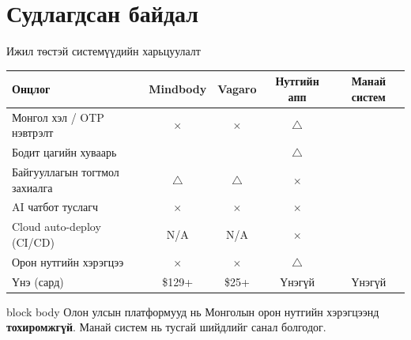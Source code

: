 \documentclass[14pt,aspectratio=169]{beamer}
\newcommand{\YES}{\textcolor{okgreen}{\checkmark}}
\newcommand{\NO}{\textcolor{badred}{$\times$}}
\newcommand{\PART}{\textcolor{partcolor}{$\triangle$}}
\begin{document}
\section{Судлагдсан байдал}
\begin{frame}{Ижил төстэй системүүдийн харьцуулалт}
  \begin{center}
  \small
  \renewcommand{\arraystretch}{1.25}
  \begin{tabular}{lcccc}
    \toprule
    \rowcolor{navyblue}
    {\color{white}\textbf{Онцлог}} &
    {\color{white}\textbf{Mindbody}} &
    {\color{white}\textbf{Vagaro}} &
    {\color{white}\textbf{Нутгийн апп}} &
    {\color{white}\textbf{Манай систем}} \\
    \midrule
    \rowcolor{rowgray}
    Монгол хэл / OTP нэвтрэлт & \NO & \NO & \PART & \YES \\
    Бодит цагийн хуваарь       & \YES & \YES & \PART & \YES \\
    \rowcolor{rowgray}
    Байгууллагын тогтмол захиалга & \PART & \PART & \NO & \YES \\
    AI чатбот туслагч          & \NO & \NO & \NO & \YES \\
    \rowcolor{rowgray}
    Cloud auto-deploy (CI/CD)  & N/A & N/A & \NO & \YES \\
    Орон нутгийн хэрэгцээ      & \NO & \NO & \PART & \YES \\
    \rowcolor{rowgray}
    Үнэ (сард)                 & \$129+ & \$25+ & Үнэгүй & Үнэгүй \\
    \bottomrule
  \end{tabular}
  \end{center}
  \vspace{4pt}
  \begin{beamercolorbox}[sep=4pt,center,rounded=true]{block body}
    \small Олон улсын платформууд нь Монголын орон нутгийн хэрэгцээнд
    \textbf{тохиромжгүй}. Манай систем нь тусгай шийдлийг санал болгодог.
  \end{beamercolorbox}
\end{frame}
\end{document}
